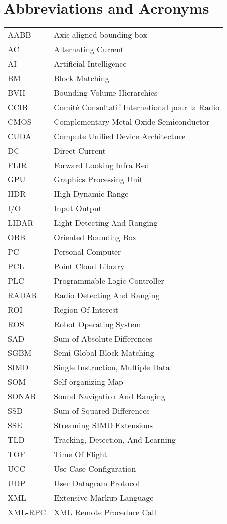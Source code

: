\documentclass[12pt,a4paper,oneside,pdftex]{report}
\begin{document}
\chapter*{Abbreviations and Acronyms}


\noindent
\begin{longtable}{@{}p{}p{}@{}}
AABB & Axis-aligned bounding-box \\
AC & Alternating Current \\
AI & Artificial Intelligence \\
BM & Block Matching \\
BVH & Bounding Volume Hierarchies \\
CCIR & Comité Consultatif International pour la Radio \\
CMOS & Complementary Metal Oxide Semiconductor \\
CUDA & Compute Unified Device Architecture \\
DC & Direct Current \\
FLIR & Forward Looking Infra Red \\
GPU & Graphics Processing Unit \\
HDR & High Dynamic Range \\
I/O & Input Output\\
LIDAR & Light Detecting And Ranging \\
OBB & Oriented Bounding Box \\
PC & Personal Computer \\
PCL & Point Cloud Library \\
PLC & Programmable Logic Controller \\
RADAR & Radio Detecting And Ranging \\
ROI & Region Of Interest \\
ROS & Robot Operating System \\
SAD & Sum of Absolute Differences \\
SGBM & Semi-Global Block Matching \\
SIMD & Single Instruction, Multiple Data \\
SOM & Self-organizing Map \\
SONAR & Sound Navigation And Ranging \\
SSD & Sum of Squared Differences \\
SSE & Streaming SIMD Extensions \\
TLD & Tracking, Detection, And Learning \\
TOF & Time Of Flight \\
UCC & Use Case Configuration \\
UDP & User Datagram Protocol \\
XML & Extensive Markup Language \\
XML-RPC & XML Remote Procedure Call \\ 
\end{longtable}
\end{document}
